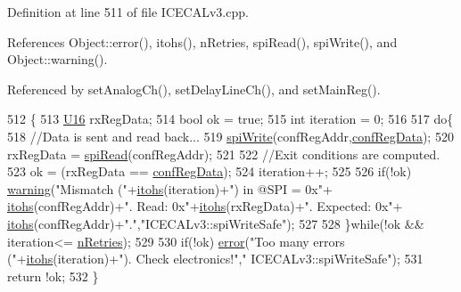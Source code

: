 Definition at line 511 of file I\+C\+E\+C\+A\+Lv3.\+cpp.



References Object\+::error(), itohs(), n\+Retries, spi\+Read(), spi\+Write(), and Object\+::warning().



Referenced by set\+Analog\+Ch(), set\+Delay\+Line\+Ch(), and set\+Main\+Reg().


\begin{DoxyCode}
512 \{
513     \hyperlink{ICECALv3_8h_adf928e51a60dba0df29d615401cc55a8}{U16} rxRegData;
514     \textcolor{keywordtype}{bool} ok = \textcolor{keyword}{true};
515     \textcolor{keywordtype}{int} iteration = 0;
516 
517     \textcolor{keywordflow}{do}\{
518         \textcolor{comment}{//Data is sent and read back...}
519         \hyperlink{classICECALv3_aef00f02801dea4bda2093c930501dcdd}{spiWrite}(confRegAddr,\hyperlink{structconfRegData}{confRegData});   
520         rxRegData = \hyperlink{classICECALv3_aaabb9543482c4141fa89b4b8410164e0}{spiRead}(confRegAddr);
521 
522         \textcolor{comment}{//Exit conditions are computed.}
523         ok = (rxRegData == \hyperlink{structconfRegData}{confRegData});
524         iteration++;
525     
526         \textcolor{keywordflow}{if}(!ok) \hyperlink{classObject_a65cd4fda577711660821fd2cd5a3b4c9}{warning}(\textcolor{stringliteral}{"Mismatch ("}+\hyperlink{classICECALv3_a04b02e583f191bfce34d05132cd23834}{itohs}(iteration)+\textcolor{stringliteral}{") in @SPI = 0x"}+
      \hyperlink{classICECALv3_a04b02e583f191bfce34d05132cd23834}{itohs}(confRegAddr)+\textcolor{stringliteral}{". Read: 0x"}+\hyperlink{classICECALv3_a04b02e583f191bfce34d05132cd23834}{itohs}(rxRegData)+\textcolor{stringliteral}{". Expected: 0x"}+
      \hyperlink{classICECALv3_a04b02e583f191bfce34d05132cd23834}{itohs}(confRegAddr)+\textcolor{stringliteral}{"."},\textcolor{stringliteral}{"ICECALv3::spiWriteSafe"}); 
527 
528     \}\textcolor{keywordflow}{while}(!ok && iteration<= \hyperlink{classICECALv3_ae877ce34b3a4d6c368cc6409ac9614fa}{nRetries});
529 
530     \textcolor{keywordflow}{if}(!ok) \hyperlink{classObject_a204a95f57818c0f811933917a30eff45}{error}(\textcolor{stringliteral}{"Too many errors ("}+\hyperlink{classICECALv3_a04b02e583f191bfce34d05132cd23834}{itohs}(iteration)+\textcolor{stringliteral}{"). Check electronics!"},\textcolor{stringliteral}{"
      ICECALv3::spiWriteSafe"});
531     \textcolor{keywordflow}{return} !ok;
532 \}
\end{DoxyCode}
\mbox{\label{classObject_a73a0f1a41828fdd8303dd662446fb6c3}} 
